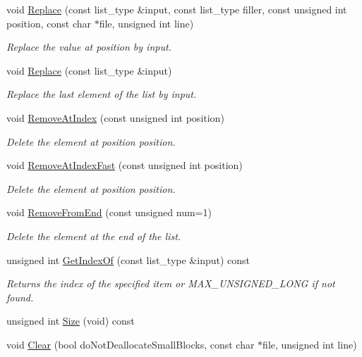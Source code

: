 \begin{DoxyCompactItemize}
void \hyperlink{class_data_structures_1_1_list_a953b497c5f51b0b4f98089c08ad15696}{Replace} (const list\-\_\-type \&input, const list\-\_\-type filler, const unsigned int position, const char $\ast$file, unsigned int line)
\begin{DoxyCompactList}\small\item\em Replace the value at {\itshape position} by {\itshape input}. \end{DoxyCompactList}\item 
void \hyperlink{class_data_structures_1_1_list_a3eb0624d2bd176d1cc85f2ff45264eb9}{Replace} (const list\-\_\-type \&input)
\begin{DoxyCompactList}\small\item\em Replace the last element of the list by {\itshape input}. \end{DoxyCompactList}\item 
void \hyperlink{class_data_structures_1_1_list_a79621376e92b605c4dbdb77aafbb6b60}{Remove\-At\-Index} (const unsigned int position)
\begin{DoxyCompactList}\small\item\em Delete the element at position {\itshape position}. \end{DoxyCompactList}\item 
void \hyperlink{class_data_structures_1_1_list_a351a647150169c71cc3f758dbb312096}{Remove\-At\-Index\-Fast} (const unsigned int position)
\begin{DoxyCompactList}\small\item\em Delete the element at position {\itshape position}. \end{DoxyCompactList}\item 
\hypertarget{class_data_structures_1_1_list_aeed32cd1075569515bb825f874dca24e}{void \hyperlink{class_data_structures_1_1_list_aeed32cd1075569515bb825f874dca24e}{Remove\-From\-End} (const unsigned num=1)}\label{class_data_structures_1_1_list_aeed32cd1075569515bb825f874dca24e}

\begin{DoxyCompactList}\small\item\em Delete the element at the end of the list. \end{DoxyCompactList}\item 
unsigned int \hyperlink{class_data_structures_1_1_list_aae4e608a6f4cc3560ee3b3b20eda67fe}{Get\-Index\-Of} (const list\-\_\-type \&input) const 
\begin{DoxyCompactList}\small\item\em Returns the index of the specified item or M\-A\-X\-\_\-\-U\-N\-S\-I\-G\-N\-E\-D\-\_\-\-L\-O\-N\-G if not found. \end{DoxyCompactList}\item 
unsigned int \hyperlink{class_data_structures_1_1_list_a6f13a4519693cbd16cd13b1fe284f330}{Size} (void) const 
\item 
\hypertarget{class_data_structures_1_1_list_a34219a5ce92981102d06fb1da7842a6b}{void \hyperlink{class_data_structures_1_1_list_a34219a5ce92981102d06fb1da7842a6b}{Clear} (bool do\-Not\-Deallocate\-Small\-Blocks, const char $\ast$file, unsigned int line)}\label{class_data_structures_1_1_list_a34219a5ce92981102d06fb1da7842a6b}


\end{DoxyCompactItemize}
